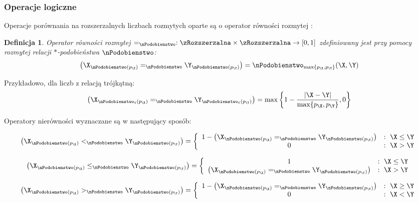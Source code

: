\documentclass[a4paper,twoside,12pt]{book}
\newtheorem{Definition}{Definicja}
\begin{document}
\subsubsection{Operacje logiczne}
Operacje porównania na rozszerzalnych liczbach rozmytych oparte są o operator równości rozmytej \cite{bib:fuzzy-numbers-revisited-logic-operations}:
\begin{Definition}
	Operator równości rozmytej $=_{\nPodobienstwo}: \zRozszerzalna \times \zRozszerzalna \to [0,1]$ zdefiniowany jest przy pomocy rozmytej relacji $\ast$-podobieństwa $\nPodobienstwo$:
	\begin{align}
		\left(\X_{\nPodobienstwo(p_{\X})} =_{\nPodobienstwo} \Y_{\nPodobienstwo(p_{\Y})}\right) = \nPodobienstwo_{\max\{p_{\X},p_{\Y}\}}(\X, \Y)
	\end{align}
\end{Definition}

Przykładowo, dla liczb z relacją trójkątną:
\begin{align}
	\left(\X_{\nPodobienstwo_{t}(p_{\X})} =_{\nPodobienstwo} \Y_{\nPodobienstwo_{t}(p_{\Y})}\right) = \max \left\{1 - \frac{|\X-\Y|}{\max\{p_{\X},p_{\Y}\}}, 0 \right\}
\end{align}

Operatory nierówności wyznaczane są w następujący sposób:

\begin{align}
	\left(\X_{\nPodobienstwo(p_{\X})} <_{\nPodobienstwo} \Y_{\nPodobienstwo(p_{\Y})}\right) = \left\{ \begin{array}{cl}
	1 -  \left(\X_{\nPodobienstwo(p_{\X})} =_{\nPodobienstwo} \Y_{\nPodobienstwo(p_{\Y})}\right) & : \  \X \le \Y \\
	0 & : \ \X > \Y
	\end{array} \right.
\end{align}

\begin{align}
	\left(\X_{\nPodobienstwo(p_{\X})} \le_{\nPodobienstwo} \Y_{\nPodobienstwo(p_{\Y})}\right) = \left\{ \begin{array}{cl}
	1 & : \  \X \le \Y \\
	\left(\X_{\nPodobienstwo(p_{\X})} =_{\nPodobienstwo} \Y_{\nPodobienstwo(p_{\Y})}\right) & : \ \X > \Y
	\end{array} \right.
\end{align}

\begin{align}
	\left(\X_{\nPodobienstwo(p_{\X})} >_{\nPodobienstwo} \Y_{\nPodobienstwo(p_{\Y})}\right) = \left\{ \begin{array}{cl}
	1 -  \left(\X_{\nPodobienstwo(p_{\X})} =_{\nPodobienstwo} \Y_{\nPodobienstwo(p_{\Y})}\right) & : \  \X \ge \Y \\
	0 & : \ \X < \Y
	\end{array} \right.
\end{align}
\end{document}
